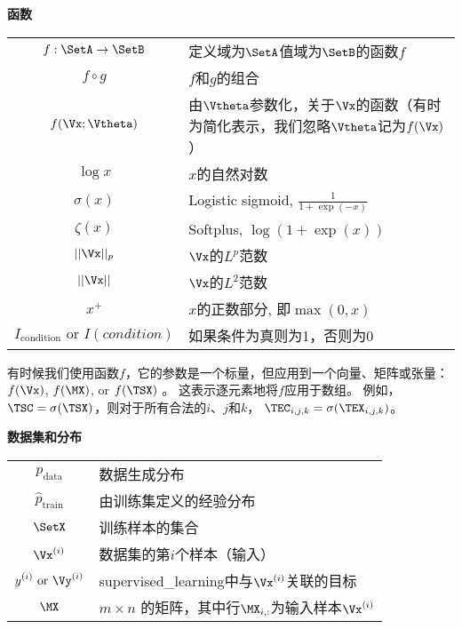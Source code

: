 \vspace{\notationgap}
\begin{minipage}{\textwidth}
\centerline{\bf 函数}
\bgroup
\def\arraystretch{1.5}
\begin{tabular}{cp{3.25in}}
$\displaystyle f: \SetA \rightarrow \SetB$ & 定义域为$\SetA$值域为$\SetB$的函数$f$ \\
$\displaystyle f \circ g $ &  $f$和$g$的组合 \\
$\displaystyle f(\Vx ; \Vtheta) $ &  由$\Vtheta$参数化，关于$\Vx$的函数（有时为简化表示，我们忽略$\Vtheta$记为$f(\Vx)$ ）\\
$\displaystyle \log x$ & $x$的自然对数 \\
$\displaystyle \sigma(x)$ & Logistic sigmoid, $\displaystyle \frac{1} {1 + \exp(-x)}$ \\
$\displaystyle \zeta(x)$ & Softplus, $\log(1 + \exp(x))$ \\
$\displaystyle || \Vx ||_p $ & $\Vx$的$L^p$范数 \\
$\displaystyle || \Vx || $ &  $\Vx$的$L^2$范数 \\
$\displaystyle x^+$ & $x$的正数部分, 即$\max(0,x)$\\
$\displaystyle I_\mathrm{condition} \text{ or } I(condition)$ & 如果条件为真则为1，否则为0\\ 

\end{tabular}
\egroup
\end{minipage}

有时候我们使用函数$f$，它的参数是一个标量，但应用到一个向量、矩阵或张量： $f(\Vx)$, $f(\MX)$, or $f(\TSX)$ 。
这表示逐元素地将$f$应用于数组。
例如，$\TSC = \sigma(\TSX)$，则对于所有合法的$i$、$j$和$k$， $\TEC_{i,j,k} = \sigma(\TEX_{i,j,k})$。


\vspace{\notationgap}
\begin{minipage}{\textwidth}
\centerline{\bf 数据集和分布}
\bgroup
\def\arraystretch{1.5}
\begin{tabular}{cp{3.25in}}
$\displaystyle p_{\text{data}}$ & 数据生成分布 \\
$\displaystyle \hat{p}_{\text{train}}$ & 由训练集定义的经验分布 \\
$\displaystyle \SetX$ & 训练样本的集合 \\
$\displaystyle \Vx^{(i)}$ & 数据集的第$i$个样本（输入）\\
$\displaystyle y^{(i)}\text{ or }\Vy^{(i)}$ & \gls{supervised_learning}中与$\Vx^{(i)}$关联的目标 \\
$\displaystyle \MX$ & $m \times n$ 的矩阵，其中行$\MX_{i,:}$为输入样本$\Vx^{(i)}$ \\
\end{tabular} 
\egroup
\end{minipage}
